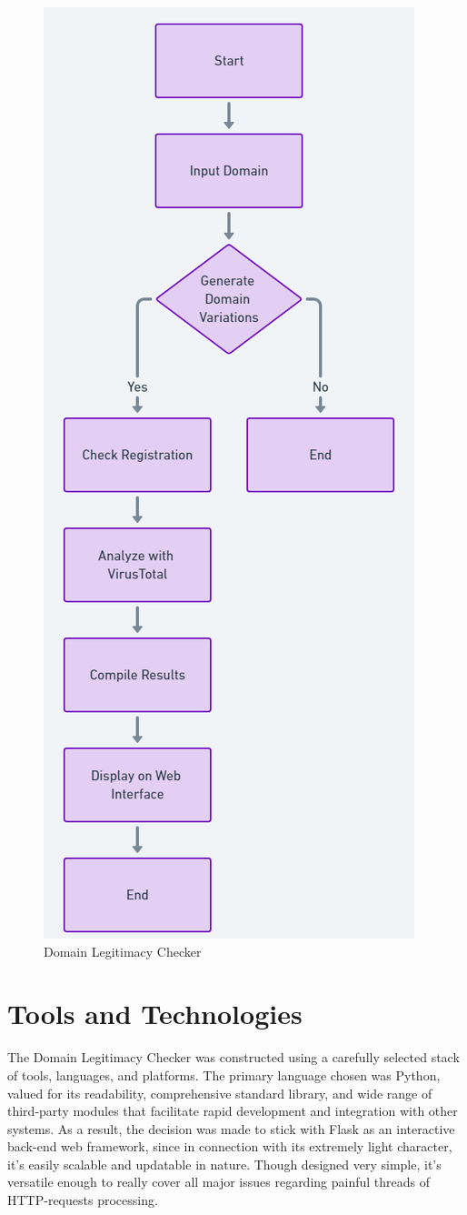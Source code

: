 \begin{figure}[H]
    \centering
    \includegraphics[width=0.6\linewidth]{project/DNS Abuse Inspector Operational Flowchart.png}
    \caption{Domain Legitimacy Checker}
    \label{fig:figfigfig}
\end{figure}
\newpage


\section{Tools and Technologies}

The Domain Legitimacy Checker was constructed using a carefully selected stack of tools, languages, and platforms. The primary language chosen was Python, valued for its readability, comprehensive standard library, and wide range of third-party modules that facilitate rapid development and integration with other systems. As a result, the decision was made to stick with Flask as an interactive back-end web framework, since in connection with its extremely light character, it's easily scalable and updatable in nature. Though designed very simple, it's versatile enough to really cover all major issues regarding painful threads of HTTP-requests processing.

